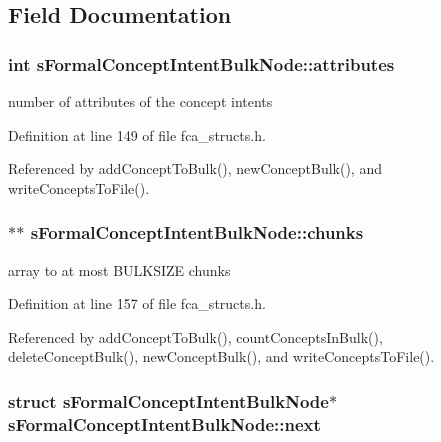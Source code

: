 \subsection{\-Field \-Documentation}
\hypertarget{structsFormalConceptIntentBulkNode_a1fbfa6da3820560fef8549991a83e694}{
\subsubsection[{attributes}]{\setlength{\rightskip}{0pt plus 5cm}int {\bf s\-Formal\-Concept\-Intent\-Bulk\-Node\-::attributes}}}\label{structsFormalConceptIntentBulkNode_a1fbfa6da3820560fef8549991a83e694}


number of attributes of the concept intents 



\-Definition at line 149 of file fca\-\_\-structs.\-h.



\-Referenced by add\-Concept\-To\-Bulk(), new\-Concept\-Bulk(), and write\-Concepts\-To\-File().

\hypertarget{structsFormalConceptIntentBulkNode_a581d8ff2f4deebf047730cfd5be1f754}{
\subsubsection[{chunks}]{$\ast$$\ast$ {\bf s\-Formal\-Concept\-Intent\-Bulk\-Node\-::chunks}}}\label{structsFormalConceptIntentBulkNode_a581d8ff2f4deebf047730cfd5be1f754}


array to at most \-B\-U\-L\-K\-S\-I\-Z\-E chunks 



\-Definition at line 157 of file fca\-\_\-structs.\-h.



\-Referenced by add\-Concept\-To\-Bulk(), count\-Concepts\-In\-Bulk(), delete\-Concept\-Bulk(), new\-Concept\-Bulk(), and write\-Concepts\-To\-File().

\hypertarget{structsFormalConceptIntentBulkNode_a1cff65c57653d96d207878be8614b383}{
\subsubsection[{next}]{\setlength{\rightskip}{0pt plus 5cm}struct {\bf s\-Formal\-Concept\-Intent\-Bulk\-Node}$\ast$ {\bf s\-Formal\-Concept\-Intent\-Bulk\-Node\-::next}}}\label{structsFormalConceptIntentBulkNode_a1cff65c57653d96d207878be8614b383}


